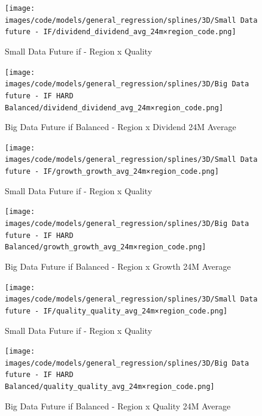 \documentclass[11pt,english,a4paper,hidelinks]{book}
\begin{document}
\begin{figure}[H]
    \centering
    \begin{minipage}{0.48\textwidth}
        \centering
        \texttt{[image: images/code/models/general\_regression/splines/3D/Small Data future - IF/dividend\_dividend\_avg\_24m×region\_code.png]}
        \caption{Small Data Future \acrshort{if} -  Region x Quality}
        \label{fig:small_tensor_region_dividend_avg_24m}
    \end{minipage}
    \begin{minipage}{0.48\textwidth}
        \centering
        \texttt{[image: images/code/models/general\_regression/splines/3D/Big Data future - IF HARD Balanced/dividend\_dividend\_avg\_24m×region\_code.png]}
        \caption{Big Data Future \acrshort{if} Balanced -  Region x Dividend 24M Average}
        \label{fig:tensor_region_dividend_avg_24m}
    \end{minipage}\hfill
\end{figure}

\begin{figure}[H]
    \centering
    \begin{minipage}{0.48\textwidth}
        \centering
        \texttt{[image: images/code/models/general\_regression/splines/3D/Small Data future - IF/growth\_growth\_avg\_24m×region\_code.png]}
        \caption{Small Data Future \acrshort{if} -  Region x Quality}
        \label{fig:small_tensor_region_growth_avg_24m}
    \end{minipage}
    \begin{minipage}{0.48\textwidth}
        \centering
        \texttt{[image: images/code/models/general\_regression/splines/3D/Big Data future - IF HARD Balanced/growth\_growth\_avg\_24m×region\_code.png]}
        \caption{Big Data Future \acrshort{if} Balanced -  Region x Growth 24M Average}
        \label{fig:tensor_region_growth_avg_24m}
    \end{minipage}\hfill
\end{figure}

\begin{figure}[H]
    \centering
    \begin{minipage}{0.48\textwidth}
        \centering
        \texttt{[image: images/code/models/general\_regression/splines/3D/Small Data future - IF/quality\_quality\_avg\_24m×region\_code.png]}
        \caption{Small Data Future \acrshort{if} -  Region x Quality}
        \label{fig:small_tensor_region_quality_avg_24m}
    \end{minipage}
    \begin{minipage}{0.48\textwidth}
        \centering
        \texttt{[image: images/code/models/general\_regression/splines/3D/Big Data future - IF HARD Balanced/quality\_quality\_avg\_24m×region\_code.png]}
        \caption{Big Data Future \acrshort{if} Balanced -  Region x Quality 24M Average}
        \label{fig:tensor_region_quality_avg_24m}
    \end{minipage}\hfill
\end{figure}
\end{document}
